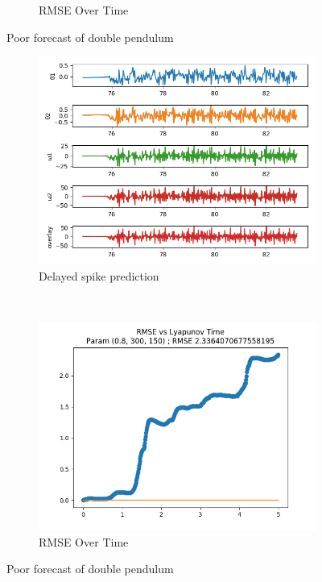 \documentclass{article}
\begin{document}
\begin{figure}[H]
\begin{subfigure}[b]{0.45\textwidth}
        \caption{RMSE Over Time}
    \end{subfigure}
    \caption{Poor forecast of double pendulum}
\end{figure}

\begin{figure}[H]
    \centering
    \begin{subfigure}[b]{0.45\textwidth}
        \includegraphics[width=\textwidth]{doc/paper/images/doub_pend/rank_1_param_63_fit.png}
        \caption{Delayed spike prediction}
    \end{subfigure}
    ~
    \begin{subfigure}[b]{0.45\textwidth}
        \includegraphics[width=\textwidth]{doc/paper/images/lorenz/rank_1_param_230_rmse.png}
        \caption{RMSE Over Time}
    \end{subfigure}
    \caption{Poor forecast of double pendulum}
\end{figure}
\end{document}

